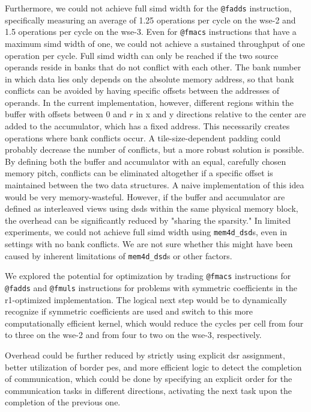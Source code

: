 Furthermore, we could not achieve full \ac{simd} width for the \texttt{@fadds} instruction, specifically measuring an average of 1.25 operations per cycle on the \ac{wse}-2 and 1.5 operations per cycle on the \ac{wse}-3. Even for \texttt{@fmacs} instructions that have a maximum \ac{simd} width of one, we could not achieve a sustained throughput of one operation per cycle. Full \ac{simd} width can only be reached if the two source operands reside in banks that do not conflict with each other. The bank number in which data lies only depends on the absolute memory address, so that bank conflicts can be avoided by having specific offsets between the addresses of operands. In the current implementation, however, different regions within the buffer with offsets between 0 and $r$ in x and y directions relative to the center are added to the accumulator, which has a fixed address.
This necessarily creates operations where bank conflicts occur.
A tile-size-dependent padding could probably decrease the number of conflicts, but a more robust solution is possible.
By defining both the buffer and accumulator with an equal, carefully chosen memory pitch, conflicts can be eliminated altogether if a specific offset is maintained between the two data structures.
A naive implementation of this idea would be very memory-wasteful.
However, if the buffer and accumulator are defined as interleaved views using \acp{dsd} within the same physical memory block, the overhead can be significantly reduced by "sharing the sparsity."
In limited experiments, we could not achieve full \ac{simd} width using \texttt{mem4d\_dsd}s, even in settings with no bank conflicts. We are not sure whether this might have been caused by inherent limitations of \texttt{mem4d\_dsd}s or other factors.

We explored the potential for optimization by trading \texttt{@fmacs} instructions for \texttt{@fadds} and \texttt{@fmuls} instructions for problems with symmetric coefficients in the r1-optimized implementation. The logical next step would be to dynamically recognize if symmetric coefficients are used and switch to this more computationally efficient kernel, which would reduce the cycles per cell from four to three on the \ac{wse}-2 and from four to two on the \ac{wse}-3, respectively.

Overhead could be further reduced by strictly using explicit \ac{dsr} assignment, better utilization of border \acp{pe}, and more efficient logic to detect the completion of communication, which could be done by specifying an explicit order for the communication tasks in different directions, activating the next task upon the completion of the previous one.


